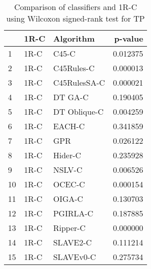 \begin{table}
\footnotesize
\caption{Comparison of classifiers and 1R-C using Wilcoxon signed-rank test for TP}
\label{tab:1R-C wilcoxon TP comparison}
\begin{tabular}{lllr}
\hline
 & 1R-C & Algorithm & p-value \\
\hline
1 & 1R-C & C45-C & 0.012375 \\
2 & 1R-C & C45Rules-C & 0.000013 \\
3 & 1R-C & C45RulesSA-C & 0.000021 \\
4 & 1R-C & DT GA-C & 0.190405 \\
5 & 1R-C & DT Oblique-C & 0.004259 \\
6 & 1R-C & EACH-C & 0.341859 \\
7 & 1R-C & GPR & 0.026122 \\
8 & 1R-C & Hider-C & 0.235928 \\
9 & 1R-C & NSLV-C & 0.006526 \\
10 & 1R-C & OCEC-C & 0.000154 \\
11 & 1R-C & OIGA-C & 0.130703 \\
12 & 1R-C & PGIRLA-C & 0.187885 \\
13 & 1R-C & Ripper-C & 0.000000 \\
14 & 1R-C & SLAVE2-C & 0.111214 \\
15 & 1R-C & SLAVEv0-C & 0.275734 \\
\hline
\end{tabular}
\end{table}
